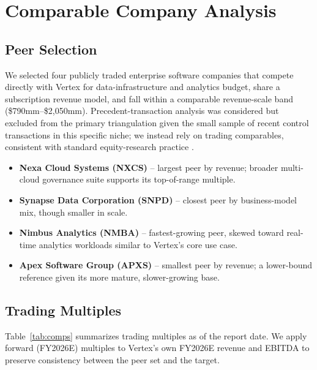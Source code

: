 \section{Comparable Company Analysis}

\subsection{Peer Selection}

We selected four publicly traded enterprise software companies that compete directly with Vertex for data-infrastructure and analytics budget, share a subscription revenue model, and fall within a comparable revenue-scale band (\$790mm--\$2,050mm). Precedent-transaction analysis was considered but excluded from the primary triangulation given the small sample of recent control transactions in this specific niche; we instead rely on trading comparables, consistent with standard equity-research practice \citep{koller2020,cfa2023}.

\begin{itemize}[leftmargin=1.3em,itemsep=1.5pt,topsep=2pt]
\item \textbf{Nexa Cloud Systems (NXCS)} -- largest peer by revenue; broader multi-cloud governance suite supports its top-of-range multiple.
\item \textbf{Synapse Data Corporation (SNPD)} -- closest peer by business-model mix, though smaller in scale.
\item \textbf{Nimbus Analytics (NMBA)} -- fastest-growing peer, skewed toward real-time analytics workloads similar to Vertex's core use case.
\item \textbf{Apex Software Group (APXS)} -- smallest peer by revenue; a lower-bound reference given its more mature, slower-growing base.
\end{itemize}

\subsection{Trading Multiples}

Table~\ref{tab:comps} summarizes trading multiples as of the report date. We apply forward (FY2026E) multiples to Vertex's own FY2026E revenue and EBITDA to preserve consistency between the peer set and the target.

